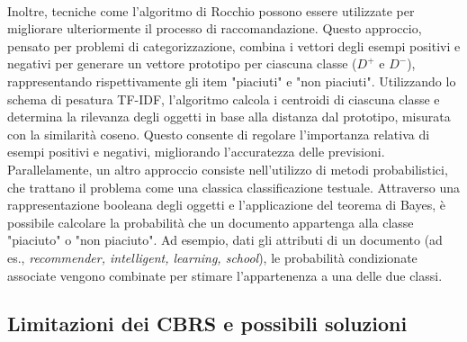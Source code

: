 \documentclass{report}
\begin{document}
	\vspace{\baselineskip}\\
	Inoltre, tecniche come l'algoritmo di Rocchio possono essere utilizzate per migliorare ulteriormente il processo di raccomandazione. Questo approccio, pensato per problemi di categorizzazione, combina i vettori degli esempi positivi e negativi per generare un vettore prototipo per ciascuna classe (\(D^+\) e \(D^-\)), rappresentando rispettivamente gli item "piaciuti" e "non piaciuti". Utilizzando lo schema di pesatura TF-IDF, l'algoritmo calcola i centroidi di ciascuna classe e determina la rilevanza degli oggetti in base alla distanza dal prototipo, misurata con la similarità coseno. Questo consente di regolare l'importanza relativa di esempi positivi e negativi, migliorando l'accuratezza delle previsioni.  Parallelamente, un altro approccio consiste nell'utilizzo di metodi probabilistici, che trattano il problema come una classica classificazione testuale. Attraverso una rappresentazione booleana degli oggetti e l'applicazione del teorema di Bayes, è possibile calcolare la probabilità che un documento appartenga alla classe "piaciuto" o "non piaciuto". Ad esempio, dati gli attributi di un documento (ad es., \textit{recommender, intelligent, learning, school}), le probabilità condizionate associate vengono combinate per stimare l'appartenenza a una delle due classi.

	\subsection{Limitazioni dei CBRS e possibili soluzioni}
\end{document}
